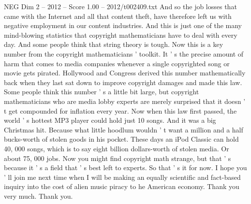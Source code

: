 \begin{textsample}{NEG Dim 2 – 2012 – Score 1.00 – 2012/t002409.txt}
And so the job losses that came with the Internet and all that content theft, have therefore left us with negative employment in our content industries.
And this is just one of the many mind-blowing statistics that copyright mathematicians have to deal with every day.
And some people think that string theory is tough.
Now this is a key number from the copyright mathematicians ' toolkit.
It ' s the precise amount of harm that comes to media companies whenever a single copyrighted song or movie gets pirated.
Hollywood and Congress derived this number mathematically back when they last sat down to improve copyright damages and made this law.
Some people think this number ' s a little bit large, but copyright mathematicians who are media lobby experts are merely surprised that it doesn ' t get compounded for inflation every year.
Now when this law first passed, the world ' s hottest MP3 player could hold just 10 songs.
And it was a big Christmas hit.
Because what little hoodlum wouldn ' t want a million and a half bucks-worth of stolen goods in his pocket.
These days an iPod Classic can hold 40, 000 songs, which is to say eight billion dollars-worth of stolen media.
Or about 75, 000 jobs.
Now you might find copyright math strange, but that ' s because it ' s a field that ' s best left to experts.
So that ' s it for now.
I hope you ' ll join me next time when I will be making an equally scientific and fact-based inquiry into the cost of alien music piracy to he American economy.
Thank you very much.
Thank you.

\end{textsample}
